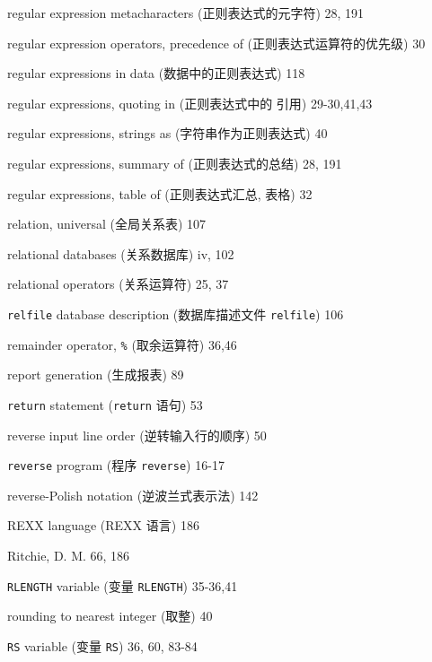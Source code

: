 \begin{multicols}{2}
\hangindent=2pc  regular expression metacharacters (正则表达式的元字符) 28, 191

\hangindent=2pc  regular expression operators, precedence of
(正则表达式运算符的优先级) 30

\hangindent=2pc  regular expressions in data
(数据中的正则表达式) 118

\hangindent=2pc  regular expressions, quoting in (正则表达式中的 
引用) 29-30,41,43

\hangindent=2pc  regular expressions, strings as
(字符串作为正则表达式) 40

\hangindent=2pc  regular expressions, summary of
(正则表达式的总结) 28, 191

\hangindent=2pc  regular expressions, table of (正则表达式汇总,
表格) 32

\hangindent=2pc  relation, universal (全局关系表) 107

\hangindent=2pc  relational databases (关系数据库) iv, 102

\hangindent=2pc  relational operators (关系运算符) 25, 37

\hangindent=2pc  \verb'relfile' database description
(数据库描述文件 \verb'relfile') 106

\hangindent=2pc  remainder operator, \verb'%' (取余运算符) 36,46

\hangindent=2pc  report generation (生成报表) 89

\hangindent=2pc  \verb'return' statement (\verb'return' 语句) 53

\hangindent=2pc  reverse input line order (逆转输入行的顺序) 50

\hangindent=2pc  \verb'reverse' program (程序 \verb'reverse') 16-17

\hangindent=2pc  reverse-Polish notation (逆波兰式表示法) 142

\hangindent=2pc  REXX language (REXX 语言) 186

\hangindent=2pc  Ritchie, D. M. 66, 186

\hangindent=2pc  \verb'RLENGTH' variable (变量 \verb'RLENGTH')
35-36,41

\hangindent=2pc  rounding to nearest integer (取整) 40

\hangindent=2pc  \verb'RS' variable (变量 \verb'RS') 36, 60, 83-84


\end{multicols}
